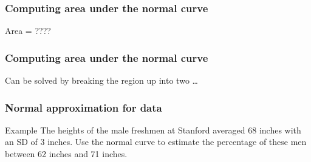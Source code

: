 \documentclass[handout]{beamer}
\begin{document}
   \begin{frame}
   \frametitle{Computing area under the normal curve}
   \begin{center}
   \end{center}
   Area = ????
   \end{frame}



   \begin{frame}
   \frametitle{Computing area under the normal curve}
   \begin{center}
   \end{center}
   Can be solved by breaking the region up into two \dots
   \end{frame}


   \begin{frame} \frametitle{Normal approximation for data}

   \begin{block}
   {Example}
   The heights of the male freshmen at Stanford averaged 68 inches
   with an SD of 3 inches. Use the normal curve to estimate the
   percentage of these men between 62 inches and 71 inches.
   \end{block}
   \end{frame}

\end{document}
